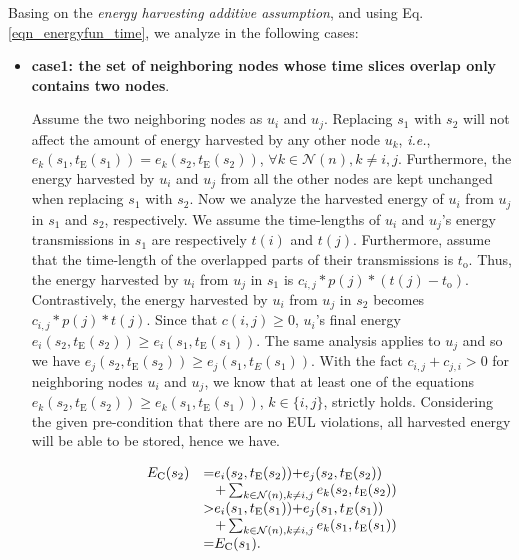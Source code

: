 \documentclass[journal,10pt]{IEEEtran}
\begin{document}
\begin{IEEEproof}
Basing on the \textit{energy harvesting additive assumption}, and using Eq.\eqref{eqn_energyfun_time}, we analyze in the following cases:
\begin{itemize}
\item{\textbf{case1: the set of neighboring nodes whose time slices overlap only contains two nodes}}.

Assume the two neighboring nodes as $u_i$ and $u_j$. Replacing $s_1$ with $s_2$ will not affect the amount of energy harvested by any other node $u_k$, \textit{i.e.}, $e_k(s_1,t_\text{E}(s_1)){=}e_k(s_2,t_\text{E}(s_2))$, ${\forall}k{\in}\mathcal{N}(n), k{\neq}i,j$. Furthermore, the energy harvested by $u_i$ and $u_j$ from all the other nodes are kept unchanged when replacing $s_1$ with $s_2$. Now we analyze the harvested energy of $u_i$ from $u_j$ in $s_1$ and $s_2$, respectively. We assume the time-lengths of $u_i$ and $u_j$'s energy transmissions in $s_1$ are respectively $t(i)$ and $t(j)$. Furthermore, assume that the time-length of the overlapped parts of their transmissions is $t_\text{o}$. Thus, the energy harvested by $u_i$ from $u_j$ in $s_1$ is $c_{i,j}{*}p(j){*}(t(j){-}t_\text{o})$. Contrastively, the energy harvested by $u_i$ from $u_j$ in $s_2$ becomes $c_{i,j}{*}p(j){*}t(j)$. Since that $c(i,j){\geq}0$, $u_i$'s final energy $e_i(s_2,t_\text{E}(s_2)){\geq}e_i(s_1,t_\text{E}(s_1))$. The same analysis applies to $u_j$ and so we have $e_j(s_2,t_\text{E}(s_2)){\geq}e_j(s_1,t_E(s_1))$. With the fact $c_{i,j}{+}c_{j,i}{>}0$ for neighboring nodes $u_i$ and $u_j$, we know that at least one of the equations $e_k(s_2,t_\text{E}(s_2)){\geq}e_k(s_1,t_\text{E}(s_1))$, $k{\in}\{i,j\}$, strictly holds. Considering the given pre-condition that there are no EUL violations, all harvested energy will be able to be stored, hence we have.

\begin{equation}
\label{eqn_disjoint_proof}
\begin{array}{rl}
E_\text{C}(s_2)&{=}e_i(s_2,t_\text{E}(s_2)){+}e_j(s_2,t_\text{E}(s_2))\\
&\hspace{3mm}
{+}\mathop{\sum}_{{k{\in}\mathcal{N}(n),k{\neq}i,j}}e_k(s_2,t_\text{E}(s_2))\\
&{>}e_i(s_1,t_\text{E}(s_1)){+}e_j(s_1,t_E(s_1))\\
&\hspace{3mm}
{+}\mathop{\sum}_{{k{\in}\mathcal{N}(n),k{\neq}i,j}}e_k(s_1,t_\text{E}(s_1))\\
&{=}E_\text{C}(s_1).
\end{array}
\end{equation}



\end{itemize}
\end{IEEEproof}
\end{document}
